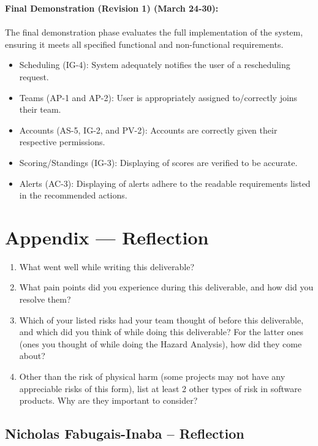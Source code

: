\documentclass{article}
\begin{document}
\textbf{Final Demonstration (Revision 1) (March 24-30):} \\\\
The final demonstration phase evaluates the full implementation of the system,
ensuring it meets all specified functional and non-functional requirements.
\begin{itemize}
  \item Scheduling (IG-4): System adequately notifies the user of a rescheduling request.
  \item Teams (AP-1 and AP-2): User is appropriately assigned to/correctly joins their
    team.
  \item Accounts (AS-5, IG-2, and PV-2): Accounts are correctly given their respective 
  permissions.
  \item Scoring/Standings (IG-3): Displaying of scores are verified to be accurate.
  \item Alerts (AC-3): Displaying of alerts adhere to the readable requirements listed
    in the recommended actions.
\end{itemize}

\newpage{}

\section*{Appendix --- Reflection}



\begin{enumerate}
    \item What went well while writing this deliverable? 
    \item What pain points did you experience during this deliverable, and how
    did you resolve them?
    \item Which of your listed risks had your team thought of before this
    deliverable, and which did you think of while doing this deliverable? For
    the latter ones (ones you thought of while doing the Hazard Analysis), how
    did they come about?
    \item Other than the risk of physical harm (some projects may not have any
    appreciable risks of this form), list at least 2 other types of risk in
    software products. Why are they important to consider?
\end{enumerate}

\subsection*{Nicholas Fabugais-Inaba -- Reflection}
\end{document}
